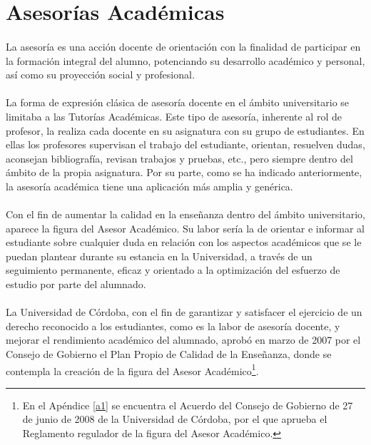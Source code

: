 \section{Asesorías Académicas}

\paragraph{}La asesoría es una acción docente de orientación con la finalidad de
participar en la formación integral del alumno, potenciando su desarrollo
académico y personal, así como su proyección social y profesional.

\paragraph{}La forma de expresión clásica de asesoría docente en el ámbito
universitario se limitaba a las Tutorías Académicas. Este tipo de asesoría,
inherente al rol de profesor, la realiza cada docente en su asignatura con su
grupo de estudiantes. En ellas los profesores supervisan el trabajo del
estudiante, orientan, resuelven dudas, aconsejan bibliografía, revisan trabajos
y pruebas, etc., pero siempre dentro del ámbito de la propia asignatura. Por su
parte, como se ha indicado anteriormente, la asesoría académica tiene una
aplicación más amplia y genérica.

\paragraph{}Con el fin de aumentar la calidad en la enseñanza dentro del ámbito
universitario, aparece la figura del Asesor Académico. Su labor sería la
de orientar e informar al estudiante sobre cualquier duda en relación con los
aspectos académicos que se le puedan plantear durante su estancia en la
Universidad, a través de un seguimiento permanente, eficaz y orientado a la
optimización del esfuerzo de estudio por parte del alumnado.

\paragraph{}La Universidad de Córdoba, con el fin de garantizar y satisfacer el
ejercicio de un derecho reconocido a los estudiantes, como es la labor de
asesoría docente, y mejorar el rendimiento académico del alumnado, aprobó en
marzo de 2007 por el Consejo de Gobierno el Plan Propio de Calidad de la
Enseñanza, donde se contempla la creación de la figura del Asesor Académico\footnote{En el Apéndice \ref{a1} se encuentra el Acuerdo del Consejo
de Gobierno de 27 de junio de 2008 de la Universidad de Córdoba, por el que
aprueba el Reglamento regulador de la figura del Asesor Académico.}.

